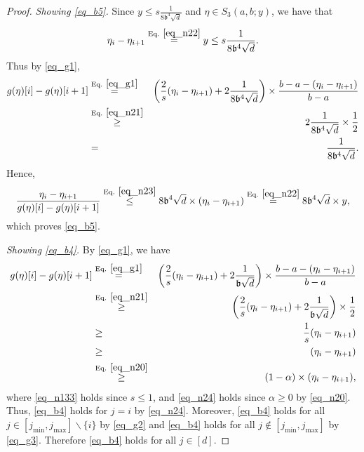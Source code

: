 \documentclass[11pt,letterpaper]{article}
\begin{document}
\begin{proof}
\medskip
\noindent
{\em Showing \eqref{eq_b5}.}
Since  $y \leq s\frac{1}{8\mathfrak{b}^4\sqrt{d} }$ and $\eta \in  S_3(a,b;y)$, 
%
we have that
%
%
\begin{equation}\label{eq_n21}
    \eta_i-\eta_{i+1} \stackrel{\textrm{Eq. } \eqref{eq_n22}}{=} y \leq s\frac{1}{8\mathfrak{b}^4\sqrt{d} }.
    \end{equation}
%
%
Thus by \eqref{eq_g1},
%
  \begin{eqnarray}\label{eq_n23}
  g(\eta)[i] - g(\eta)[i+1] &\stackrel{\textrm{Eq. } \eqref{eq_g1}}{=} &\left(\frac{2}{s}(\eta_{i}- \eta_{i+1})+ 2\frac{1}{8\mathfrak{b}^4\sqrt{d}}\right) \times \frac{b-a -(\eta_{i}- \eta_{i+1})}{b-a}\nonumber\\
  &\stackrel{\textrm{Eq. } \eqref{eq_n21}}{\geq}& 2\frac{1}{8\mathfrak{b}^4\sqrt{d}} \times \frac{1}{2}\nonumber\\
  &=& \frac{1}{8\mathfrak{b}^4\sqrt{d}}.
  \end{eqnarray}
%
Hence,  
%
\begin{equation}
\frac{\eta_{i} - \eta_{i+1}}{g(\eta)[i] -  g(\eta)[i+1]}  \stackrel{\textrm{Eq. } \eqref{eq_n23}}{\leq}  8\mathfrak{b}^4 \sqrt{d}  \times (\eta_{i} - \eta_{i+1}) \stackrel{\textrm{Eq. } \eqref{eq_n22}}{=}   8\mathfrak{b}^4 \sqrt{d}  \times y,
\end{equation}
%
which proves \eqref{eq_b5}.

\medskip
\noindent
{\em Showing \eqref{eq_b4}.}
%
By \eqref{eq_g1}, we have
%
  \begin{eqnarray}
  g(\eta)[i] - g(\eta)[i+1] &\stackrel{\textrm{Eq. } \eqref{eq_g1}}{=} &\left(\frac{2}{s}(\eta_{i}- \eta_{i+1})+ 2\frac{1}{\mathfrak{b}\sqrt{d}}\right) \times \frac{b-a -(\eta_{i}- \eta_{i+1})}{b-a} \nonumber\\
  &\stackrel{\textrm{Eq. } \eqref{eq_n21}}{\geq}& \left(\frac{2}{s}(\eta_{i}- \eta_{i+1})+ 2\frac{1}{\mathfrak{b}\sqrt{d}}\right) \times \frac{1}{2} \nonumber\\
    &\geq & \frac{1}{s}(\eta_{i}- \eta_{i+1}) \nonumber\\
        &\geq & (\eta_{i}- \eta_{i+1}) \label{eq_n133}\\
        &\stackrel{\textrm{Eq. } \eqref{eq_n20}}{\geq}& (1-\alpha)\times (\eta_{i}- \eta_{i+1}), \label{eq_n24}
  \end{eqnarray}
  where \eqref{eq_n133} holds since $s\leq 1$, and \eqref{eq_n24} holds since $\alpha \geq 0$ by \eqref{eq_n20}.
%  
  Thus, \eqref{eq_b4} holds for $j=i$ by \eqref{eq_n24}.
  Moreover, \eqref{eq_b4} holds for all  $j \in[j_{\mathrm{min}}, j_{\mathrm{max}}]\backslash \{i\}$ by \eqref{eq_g2} and  \eqref{eq_b4} holds for  all $j \notin [j_{\mathrm{min}}, j_{\mathrm{max}}]$ by \eqref{eq_g3}.
%  
  Therefore \eqref{eq_b4} holds for all $j \in [d]$.




\end{proof}
\end{document}
